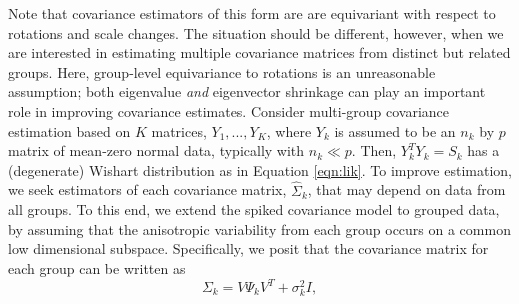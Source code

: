 \documentclass{statsoc}
\begin{document}
Note that covariance estimators of this form are are equivariant with
respect to rotations and scale changes.  The situation should be
different, however, when we are interested in estimating multiple
covariance matrices from distinct but related groups.  Here,
group-level equivariance to rotations is an unreasonable assumption;
both eigenvalue \emph{and} eigenvector shrinkage can play an important
role in improving covariance estimates.  Consider multi-group
covariance estimation based on $K$ matrices, $Y_1, ..., Y_K$, where
$Y_k$ is assumed to be an $n_k$ by $p$ matrix of mean-zero normal
data, typically with $n_k \ll p$.  Then, $Y_k^TY_k = S_k$ has a
(degenerate) Wishart distribution as in Equation \ref{eqn:lik}.  To
improve estimation, we seek estimators of each covariance matrix,
$\hat{\Sigma}_k$, that may depend on data from all groups.  To this
end, we extend the spiked covariance model to grouped data, by
assuming that the anisotropic variability from each group occurs on a
common low dimensional subspace.  Specifically, we posit that the
covariance matrix for each group can be written as
\begin{equation}
\Sigma_k = V\Psi_kV^T + \sigma^2_kI,
\label{eqn:sspsi}
\end{equation}



\end{document}
